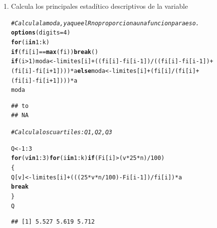 \documentclass[12pt,letterpaper]{article}\usepackage[]{graphicx}\usepackage[]{color}
\makeatletter
\newcommand{\hlnum}[1]{\textcolor[rgb]{0.686,0.059,0.569}{#1}}%
\newcommand{\hlcom}[1]{\textcolor[rgb]{0.678,0.584,0.686}{\textit{#1}}}%
\newcommand{\hlopt}[1]{\textcolor[rgb]{0,0,0}{#1}}%
\newcommand{\hlstd}[1]{\textcolor[rgb]{0.345,0.345,0.345}{#1}}%
\newcommand{\hlkwa}[1]{\textcolor[rgb]{0.161,0.373,0.58}{\textbf{#1}}}%
\newcommand{\hlkwb}[1]{\textcolor[rgb]{0.69,0.353,0.396}{#1}}%
\newcommand{\hlkwc}[1]{\textcolor[rgb]{0.333,0.667,0.333}{#1}}%
\newcommand{\hlkwd}[1]{\textcolor[rgb]{0.737,0.353,0.396}{\textbf{#1}}}%
\newenvironment{kframe}{%
 \def\at@end@of@kframe{}%
 \ifinner\ifhmode%
  \def\at@end@of@kframe{\end{minipage}}%
  \begin{minipage}{\columnwidth}%
 \fi\fi%
 \def\FrameCommand##1{\hskip\@totalleftmargin \hskip-\fboxsep
 \colorbox{shadecolor}{##1}\hskip-\fboxsep
     \hskip-\linewidth \hskip-\@totalleftmargin \hskip\columnwidth}%
 \MakeFramed {\advance\hsize-\width
   \@totalleftmargin\z@ \linewidth\hsize
   \@setminipage}}%
 {\par\unskip\endMakeFramed%
 \at@end@of@kframe}
\newenvironment{knitrout}{}{} %
\makeatother
\begin{document}
\begin{enumerate}
\item  Calcula los principales estad\'itico descriptivos de la variable
\begin{knitrout}
\color{fgcolor}\begin{kframe}
\begin{alltt}
\hlcom{# Calcula la moda, ya que el R no proporciona una funcion para eso.}
\hlkwd{options}\hlstd{(}\hlkwc{digits}\hlstd{=}\hlnum{4}\hlstd{)}
\hlkwa{for}\hlstd{(i} \hlkwa{in} \hlnum{1}\hlopt{:}\hlstd{k)}
  \hlkwa{if} \hlstd{(fi[i]} \hlopt{==} \hlkwd{max}\hlstd{(fi))} \hlkwa{break}\hlstd{()}
\hlkwa{if}\hlstd{(i} \hlopt{>} \hlnum{1}\hlstd{) moda} \hlkwb{<-} \hlstd{limites[i]}\hlopt{+}\hlstd{((fi[i]}\hlopt{-}\hlstd{fi[i}\hlopt{-}\hlnum{1}\hlstd{])}\hlopt{/}\hlstd{((fi[i]}\hlopt{-}\hlstd{fi[i}\hlopt{-}\hlnum{1}\hlstd{])}\hlopt{+}
 \hlstd{(fi[i]}\hlopt{-}\hlstd{fi[i}\hlopt{+}\hlnum{1}\hlstd{]) ))}\hlopt{*}\hlstd{a} \hlkwa{else} \hlstd{moda} \hlkwb{<-} \hlstd{limites[i]}\hlopt{+}\hlstd{(fi[i]}\hlopt{/}\hlstd{(fi[i]}\hlopt{+}
                          \hlstd{(fi[i]}\hlopt{-}\hlstd{fi[i}\hlopt{+}\hlnum{1}\hlstd{])))}\hlopt{*}\hlstd{a}
\hlstd{moda}
\end{alltt}
\begin{verbatim}
## to 
## NA
\end{verbatim}
\end{kframe}
\end{knitrout}

\begin{knitrout}
\color{fgcolor}\begin{kframe}
\begin{alltt}
\hlcom{# Calcula los cuartiles: Q1, Q2, Q3}

\hlstd{Q} \hlkwb{<-} \hlnum{1}\hlopt{:}\hlnum{3}
\hlkwa{for}\hlstd{(v} \hlkwa{in} \hlnum{1}\hlopt{:}\hlnum{3}\hlstd{)} \hlkwa{for}\hlstd{(i} \hlkwa{in} \hlnum{1}\hlopt{:}\hlstd{k)} \hlkwa{if} \hlstd{(Fi[i]} \hlopt{>} \hlstd{(v}\hlopt{*}\hlnum{25}\hlopt{*}\hlstd{n)}\hlopt{/}\hlnum{100}\hlstd{)}
\hlstd{\{}
  \hlstd{Q[v]} \hlkwb{<-} \hlstd{limites[i]}\hlopt{+}\hlstd{(((}\hlnum{25}\hlopt{*}\hlstd{v}\hlopt{*}\hlstd{n}\hlopt{/}\hlnum{100}\hlstd{)}\hlopt{-}\hlstd{Fi[i}\hlopt{-}\hlnum{1}\hlstd{])}\hlopt{/}\hlstd{fi[i])}\hlopt{*}\hlstd{a}
  \hlkwa{break}
\hlstd{\}}
\hlstd{Q}
\end{alltt}
\begin{verbatim}
## [1] 5.527 5.619 5.712
\end{verbatim}
\end{kframe}
\end{knitrout}
\end{enumerate}
\end{document}
